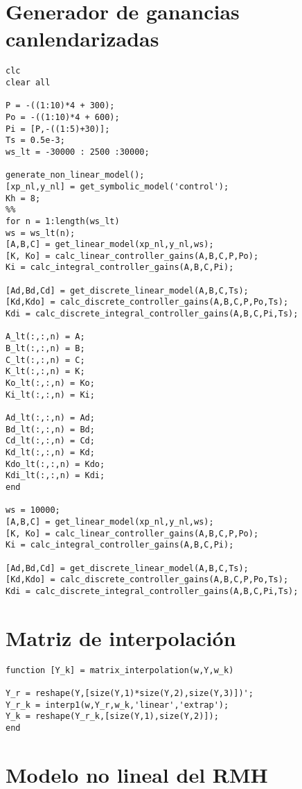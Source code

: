 \section{Generador de ganancias canlendarizadas} \label{ap:generador-calendarizado}
\begin{lstlisting}[frame=single]
clc
clear all

P = -((1:10)*4 + 300);
Po = -((1:10)*4 + 600); 
Pi = [P,-((1:5)+30)];
Ts = 0.5e-3;
ws_lt = -30000 : 2500 :30000;

generate_non_linear_model();
[xp_nl,y_nl] = get_symbolic_model('control');
Kh = 8;
%%
for n = 1:length(ws_lt)
ws = ws_lt(n);
[A,B,C] = get_linear_model(xp_nl,y_nl,ws);
[K, Ko] = calc_linear_controller_gains(A,B,C,P,Po);
Ki = calc_integral_controller_gains(A,B,C,Pi);

[Ad,Bd,Cd] = get_discrete_linear_model(A,B,C,Ts);
[Kd,Kdo] = calc_discrete_controller_gains(A,B,C,P,Po,Ts);
Kdi = calc_discrete_integral_controller_gains(A,B,C,Pi,Ts);

A_lt(:,:,n) = A; 
B_lt(:,:,n) = B;
C_lt(:,:,n) = C;
K_lt(:,:,n) = K;
Ko_lt(:,:,n) = Ko;
Ki_lt(:,:,n) = Ki;

Ad_lt(:,:,n) = Ad; 
Bd_lt(:,:,n) = Bd;
Cd_lt(:,:,n) = Cd;
Kd_lt(:,:,n) = Kd;
Kdo_lt(:,:,n) = Kdo;
Kdi_lt(:,:,n) = Kdi;
end

ws = 10000;
[A,B,C] = get_linear_model(xp_nl,y_nl,ws);
[K, Ko] = calc_linear_controller_gains(A,B,C,P,Po);
Ki = calc_integral_controller_gains(A,B,C,Pi);

[Ad,Bd,Cd] = get_discrete_linear_model(A,B,C,Ts);
[Kd,Kdo] = calc_discrete_controller_gains(A,B,C,P,Po,Ts);
Kdi = calc_discrete_integral_controller_gains(A,B,C,Pi,Ts);

\end{lstlisting}



\section{Matriz de interpolaci\'on}

\begin{lstlisting}[frame=single]
function [Y_k] = matrix_interpolation(w,Y,w_k)

Y_r = reshape(Y,[size(Y,1)*size(Y,2),size(Y,3)])';
Y_r_k = interp1(w,Y_r,w_k,'linear','extrap');
Y_k = reshape(Y_r_k,[size(Y,1),size(Y,2)]);
end
\end{lstlisting}

\section{Modelo no lineal del RMH} \label{ap:sistema-ecuaciones-no-lineal}

